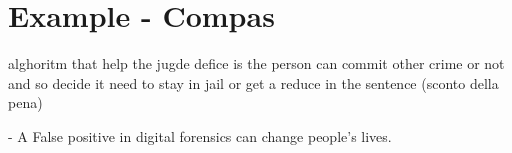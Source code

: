 \section{Example - Compas}
alghoritm that help the jugde defice is the person can commit other crime or not
and so decide it need to stay in jail or get a reduce in the sentence (sconto della pena)

- A False positive in digital forensics can change people's lives.

